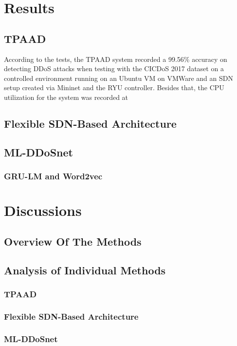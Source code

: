 \documentclass[a4paper, 12pt]{article}
\begin{document}
\section{Results}

\subsection{TPAAD} 
According to the tests, the TPAAD system recorded a 99.56\% accuracy on detecting DDoS attacks when testing with the CICDoS 2017 dataset on a controlled environment running on an Ubuntu VM on VMWare and an SDN setup created via Mininet and the RYU controller.  Besides that, the CPU utilization for the system was recorded at 

\subsection{Flexible SDN-Based Architecture}

\subsection{ML-DDoSnet}

\subsubsection{GRU-LM and Word2vec}

\section{Discussions}
\subsection{Overview Of The Methods}
\subsection{Analysis of Individual Methods}
\subsubsection{TPAAD}
\subsubsection{Flexible SDN-Based Architecture}
\subsubsection{ML-DDoSnet}
\end{document}
